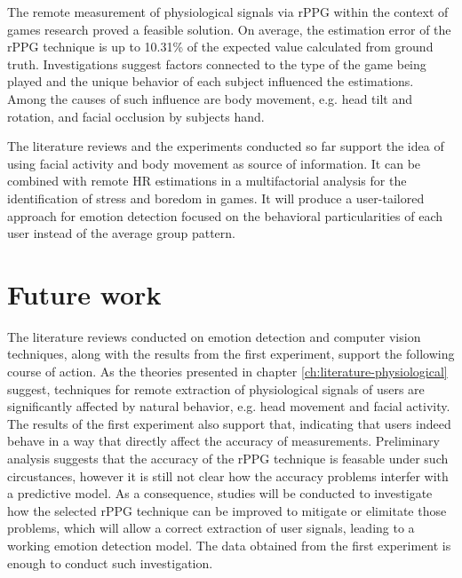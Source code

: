The remote measurement of physiological signals via rPPG within the context of games research proved a feasible solution. On average, the estimation error of the rPPG technique is up to 10.31\% of the expected value calculated from ground truth. Investigations suggest factors connected to the type of the game being played and the unique behavior of each subject influenced the estimations. Among the causes of such influence are body movement, e.g. head tilt and rotation, and facial occlusion by subjects hand.

The literature reviews and the experiments conducted so far support the idea of using facial activity and body movement as source of information. It can be combined with remote HR estimations in a multifactorial analysis for the identification of stress and boredom in games. It will produce a user-tailored approach for emotion detection focused on the behavioral particularities of each user instead of the average group pattern.

\section{Future work}

The literature reviews conducted on emotion detection and computer vision techniques, along with the results from the first experiment, support the following course of action. As the theories presented in chapter \ref{ch:literature-physiological} suggest, techniques for remote extraction of physiological signals of users are significantly affected by natural behavior, e.g. head movement and facial activity. The results of the first experiment also support that, indicating that users indeed behave in a way that directly affect the accuracy of measurements. Preliminary analysis \parencite{bevilacqua2017accuracy} suggests that the accuracy of the rPPG technique is feasable under such circustances, however it is still not clear how the accuracy problems interfer with a predictive model. As a consequence, studies will be conducted to investigate how the selected rPPG technique can be improved to mitigate or elimitate those problems, which will allow a correct extraction of user signals, leading to a working emotion detection model. The data obtained from the first experiment is enough to conduct such investigation.

